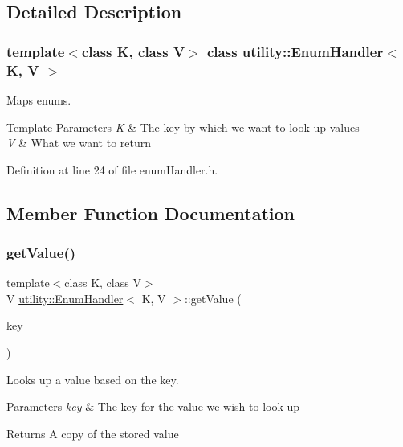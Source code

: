 \subsection{Detailed Description}
\subsubsection*{template$<$class K, class V$>$\newline
class utility\+::\+Enum\+Handler$<$ K, V $>$}

Maps enums. 


\begin{DoxyTemplParams}{Template Parameters}
{\em K} & The key by which we want to look up values \\
\hline
{\em V} & What we want to return \\
\hline
\end{DoxyTemplParams}


Definition at line 24 of file enum\+Handler.\+h.



\subsection{Member Function Documentation}
\mbox{\label{classutility_1_1EnumHandler_aa24c170157579c63d265e43eb7535291}} 
\subsubsection{\texorpdfstring{getValue()}{getValue()}}
{\footnotesize\ttfamily template$<$class K, class V$>$ \\
V \mbox{\hyperlink{classutility_1_1EnumHandler}{utility\+::\+Enum\+Handler}}$<$ K, V $>$\+::get\+Value (\begin{DoxyParamCaption}\item[{K}]{key }\end{DoxyParamCaption})\hspace{0.3cm}{\ttfamily [inline]}}



Looks up a value based on the key. 


\begin{DoxyParams}{Parameters}
{\em key} & The key for the value we wish to look up \\
\hline
\end{DoxyParams}
\begin{DoxyReturn}{Returns}
A copy of the stored value 
\end{DoxyReturn}


